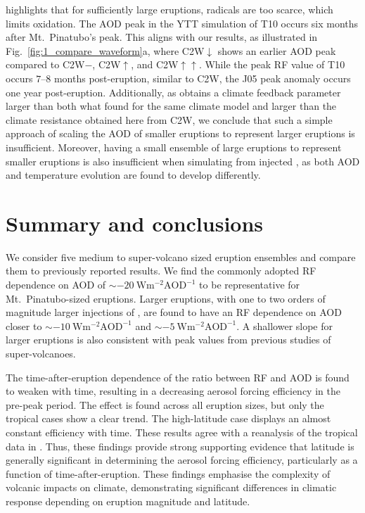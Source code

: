 \documentclass[draft]{agujournal2019}
\begin{document}
 highlights that for sufficiently large eruptions,  radicals
are too scarce, which limits  oxidation. The AOD peak in the YTT simulation of
T10 occurs six months after Mt.\ Pinatubo's peak. This aligns with our results, as
illustrated in Fig.~\ref{fig:1_compare_waveform}a, where C2W\(\downarrow\) shows an
earlier AOD peak compared to C2W\(-\), C2W\(\uparrow\), and C2W\(\uparrow\uparrow\).
While the peak RF value of T10 occurs \(7\)--\(8\) months post-eruption, similar to C2W,
the J05 peak anomaly occurs one year post-eruption. Additionally, as 
obtains a climate feedback parameter larger than both what  found for
the same climate model and larger than the climate resistance obtained here from C2W, we
conclude that such a simple approach of scaling the AOD of smaller eruptions to
represent larger eruptions is insufficient. Moreover, having a small ensemble of large
eruptions to represent smaller eruptions is also insufficient when simulating from
injected , as both AOD and temperature evolution are found to develop
differently.

\section{Summary and conclusions}\label{sec:conclusions}

We consider five medium to super-volcano sized eruption ensembles and compare them to
previously reported results. We find the commonly adopted RF dependence on AOD of
\(\sim\SI{-20}{\watt\metre^{-2}\mathrm{AOD}^{-1}}\) to be representative for Mt.\
Pinatubo-sized eruptions. Larger eruptions, with one to two orders of magnitude larger
injections of \ce{SO2}, are found to have an RF dependence on AOD closer to
\(\sim\SI{-10}{\watt\metre^{-2}\mathrm{AOD}^{-1}}\) and
\(\sim\SI{-5}{\watt\metre^{-2}\mathrm{AOD}^{-1}}\). A shallower slope for larger
eruptions is also consistent with peak values from previous studies of super-volcanoes.

The time-after-eruption dependence of the ratio between RF and AOD is found to weaken
with time, resulting in a decreasing aerosol forcing efficiency in the pre-peak period.
The effect is found across all eruption sizes, but only the tropical cases show a clear
trend. The high-latitude case displays an almost constant efficiency with time. These
results agree with a reanalysis of the tropical data in \citeA{marshall2020dataset}.
Thus, these findings provide strong supporting evidence that latitude is generally
significant in determining the aerosol forcing efficiency, particularly as a function of
time-after-eruption. These findings emphasise the complexity of volcanic impacts on
climate, demonstrating significant differences in climatic response depending on
eruption magnitude and latitude.
\end{document}
